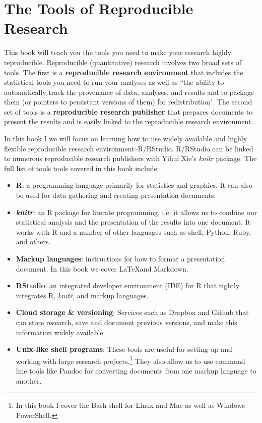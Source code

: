 \documentclass[ChapterTOCs,krantz1]{krantz}\usepackage{graphicx, color}
\begin{document}
\section{The Tools of Reproducible Research}

This book will teach you the tools you need to make your research highly reproducible. Reproducible (quantitative) research involves two broad sets of tools. The first is a {\bf{reproducible research environment}} that includes the statistical tools you need to run your analyses as well as ``the ability to automatically track the provenance of data, analyses, and results and to package them (or pointers to persistant versions of them) for redistribution". The second set of tools is a {\bf{reproducible research publisher}} that prepares documents to present the results and is easily linked to the reproducible research environment.\cite{Mesirov2010}

In this book I we will focus on learning how to use widely available and highly flexible reproducible research environment--R/RStudio. R/RStudio can be linked to numerous reproducible research publishers with Yihui Xie's {\emph{knitr}} package\cite{knitr}. The full list of tools tools covered in this book include:

\begin{itemize}
    \item {\bf{R}}: a programming language primarily for statistics and graphics. It can also be used for data gathering and creating presentation documents.
    
    \item {\bf{{\emph{knitr}}}}: an R package for literate programming, i.e. it allows us to combine our statistical analysis and the presentation of the results into one document. It works with R and a number of other languages such as shell, Python, Ruby, and others.
    
    \item {\bf{Markup languages}}: instructions for how to format a presentation document. In this book we cover \LaTeX and Markdown.  
    
    \item {\bf{RStudio}}: an integrated developer environment (IDE) for R that tightly integrates R, {\emph{knitr}}, and markup languages.
    
    \item {\bf{Cloud storage \& versioning}}: Services such as Dropbox and Github that can store research, save and document previous versions, and make this information widely available.
    
    \item {\bf{Unix-like shell programs}}: These tools are useful for setting up and working with large research projects.\footnote{In this book I cover the Bash shell for Linux and Mac as well as Windows PowerShell.} They also allow us to use command line tools like Pandoc for converting documents from one markup language to another.
\end{itemize}
\end{document}
